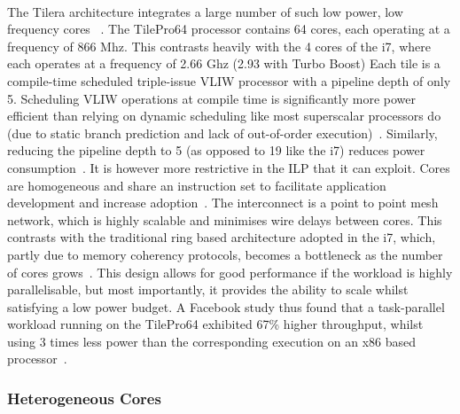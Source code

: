 \paragraph{} The Tilera architecture  integrates a large number of such low power, 
low frequency cores ~\cite{wentzlaff2007tile}. The TilePro64 processor contains 
64 cores, each operating at a frequency of 866 Mhz. This contrasts heavily
with the 4 cores of the i7, where each operates at a frequency of 2.66 Ghz (2.93 with
Turbo Boost)  Each tile is a compile-time scheduled triple-issue VLIW processor with 
a pipeline depth of only 5. Scheduling VLIW operations at compile time is 
significantly more power efficient
than relying on dynamic scheduling like most superscalar processors do (due to
static branch prediction and lack of out-of-order execution)~\cite{hennessy2006comparchquantitative}. Similarly,
reducing the pipeline depth to 5 (as opposed to 19 like the i7) reduces
power consumption~\cite{Borkar:2007:TCC:1278480.1278667}. 
It is however more restrictive in the ILP that it can exploit. Cores are homogeneous and share 
an instruction set to facilitate application development and increase adoption~\cite{wentzlaff2007tile}. The interconnect is a point to point mesh network, which
is highly scalable and minimises wire delays between cores. This
contrasts with the traditional ring based architecture adopted in the i7,  
which, partly due to memory coherency protocols, becomes a bottleneck
as the number of cores grows~\cite{1431574}. This design allows for good performance
if the workload is highly parallelisable, but most
importantly, it provides the ability to scale whilst satisfying a low power budget. A Facebook study thus found that a task-parallel workload running on the TilePro64 exhibited
67\% higher throughput, whilst using 3 times less power than the corresponding
execution on an x86 based processor~\cite{berezecki2011manycore}. 

\subsubsection{Heterogeneous Cores} 
